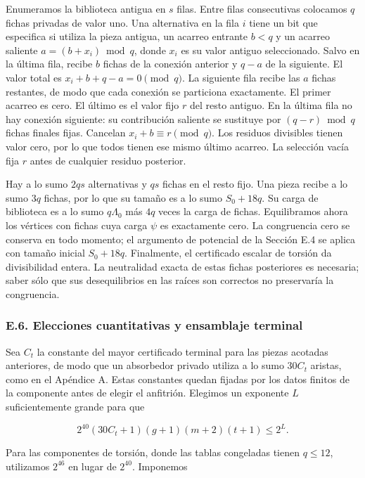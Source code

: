 \documentclass[spanish,11pt,a4paper]{article}
\begin{document}
Enumeramos la biblioteca antigua en \(s\) filas. Entre filas consecutivas colocamos \(q\) fichas privadas de valor uno. Una alternativa en la fila \(i\) tiene un bit que especifica si utiliza la pieza antigua, un acarreo entrante \(b<q\) y un acarreo saliente \(a=(b+x_i)\bmod q\), donde \(x_i\) es su valor antiguo seleccionado. Salvo en la última fila, recibe \(b\) fichas de la conexión anterior y \(q-a\) de la siguiente. El valor total es \(x_i+b+q-a=0\pmod q\). La siguiente fila recibe las \(a\) fichas restantes, de modo que cada conexión se particiona exactamente. El primer acarreo es cero. El último es el valor fijo \(r\) del resto antiguo. En la última fila no hay conexión siguiente: su contribución saliente se sustituye por \((q-r)\bmod q\) fichas finales fijas. Cancelan \(x_i+b\equiv r\pmod q\). Los residuos divisibles tienen valor cero, por lo que todos tienen ese mismo último acarreo. La selección vacía fija \(r\) antes de cualquier residuo posterior.

Hay a lo sumo \(2qs\) alternativas y \(qs\) fichas en el resto fijo. Una pieza recibe a lo sumo \(3q\) fichas, por lo que su tamaño es a lo sumo \(S_0+18q\). Su carga de biblioteca es a lo sumo \(q\Lambda_0\) más \(4q\) veces la carga de fichas. Equilibramos ahora los vértices con fichas cuya carga \(\psi\) es exactamente cero. La congruencia cero se conserva en todo momento; el argumento de potencial de la Sección E.4 se aplica con tamaño inicial \(S_0+18q\). Finalmente, el certificado escalar de torsión da divisibilidad entera. La neutralidad exacta de estas fichas posteriores es necesaria; saber sólo que sus desequilibrios en las raíces son correctos no preservaría la congruencia.

\subsubsection{E.6. Elecciones cuantitativas y ensamblaje terminal}\label{e.6.-elecciones-cuantitativas-y-ensamblaje-terminal}

Sea \(C_t\) la constante del mayor certificado terminal para las piezas acotadas anteriores, de modo que un absorbedor privado utiliza a lo sumo \(30C_t\) aristas, como en el Apéndice A. Estas constantes quedan fijadas por los datos finitos de la componente antes de elegir el anfitrión. Elegimos un exponente \(L\) suficientemente grande para que

\[2^{40}(30C_t+1)(g+1)(m+2)(t+1)\le2^L.
\tag{E.6.1}\]

Para las componentes de torsión, donde las tablas congeladas tienen \(q\le12\), utilizamos \(2^{46}\) en lugar de \(2^{40}\). Imponemos
\end{document}
